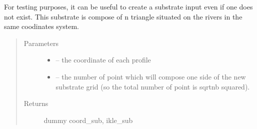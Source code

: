 \documentclass[letterpaper,10pt,english]{sphinxmanual}
\begin{document}

\begin{fulllineitems}
\label{\detokenize{index:src.manage_grid_8.create_dummy_substrate}}
For testing purposes, it can be useful to create a substrate input even if one does not exist.
This substrate is compose of n triangle situated on the rivers in the same coodinates system.
\begin{quote}\begin{description}
\item[{Parameters}] \leavevmode\begin{itemize}
\item {} 
 -- the coordinate of each profile

\item {} 
 -- the number of point which will compose one side of the new substrate grid (so the total number
of point is sqrtnb squared).

\end{itemize}

\item[{Returns}] \leavevmode
dummy coord\_sub, ikle\_sub

\end{description}\end{quote}

\end{fulllineitems}

\end{document}
